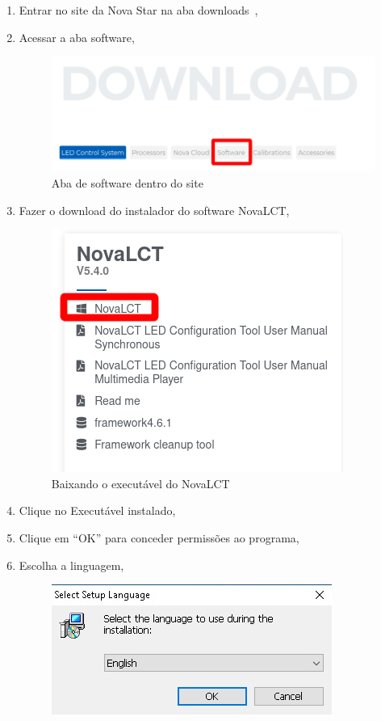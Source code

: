 \documentclass[12pt, a4paper]{article}
\begin{document}
\begin{enumerate}
	\item Entrar no site da Nova Star na aba downloads~\cite{siteDownload},
	\item Acessar a aba software,
		\begin{figure}[!htb]
			\centering
			\includegraphics[width=\textwidth]{Download.png}
			\caption{\label{fig:Download}Aba de software dentro do site~\cite{siteDownload}}
		\end{figure}
	\item Fazer o download do instalador do software NovaLCT,
		\begin{figure}[!htb]
			\centering
			\includegraphics[scale=.9]{NOVALCT_INSTALL.png}
			\caption{\label{fig:NOVALCT_INSTALL}Baixando o executável do NovaLCT}
		\end{figure}
		\newpage
	\item Clique no Executável instalado,
	\item Clique em ``OK'' para conceder permissões ao programa,
	\item Escolha a linguagem,
		\begin{figure}[!htb]
			\centering
			\includegraphics[width=\textwidth]{D1.jpeg}

\end{figure}
\end{enumerate}
\end{document}

